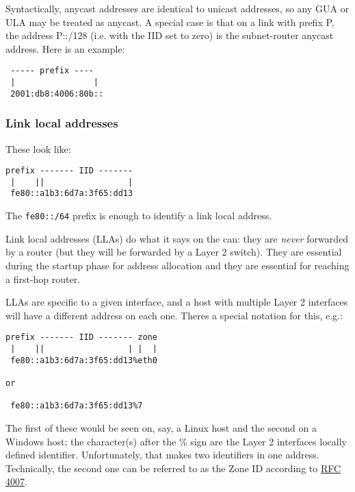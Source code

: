 \documentclass[
]{article}
\begin{document}
Syntactically, anycast addresses are identical to unicast addresses, so
any GUA or ULA may be treated as anycast. A special case is that on a
link with prefix P, the address P::/128 (i.e. with the IID set to zero)
is the subnet-router anycast address. Here is an example:

\begin{verbatim}
 ----- prefix ----
 |                |
 2001:db8:4006:80b::
\end{verbatim}

\subsubsection{Link local addresses}\label{link-local-addresses}

These look like:

\begin{verbatim}
prefix ------- IID -------
 |    ||                 |
 fe80::a1b3:6d7a:3f65:dd13
\end{verbatim}

The \texttt{fe80::/64} prefix is enough to identify a link local
address.

Link local addresses (LLAs) do what it says on the can: they are
\emph{never} forwarded by a router (but they will be forwarded by a
Layer 2 switch). They are essential during the startup phase for address
allocation and they are essential for reaching a first-hop router.

LLAs are specific to a given interface, and a host with multiple Layer 2
interfaces will have a different address on each one.
There\textquotesingle s a special notation for this, e.g.:

\begin{verbatim}
prefix ------- IID ------- zone
 |    ||                 | |  |
 fe80::a1b3:6d7a:3f65:dd13%eth0

or

 fe80::a1b3:6d7a:3f65:dd13%7
\end{verbatim}

The first of these would be seen on, say, a Linux host and the second on
a Windows host; the character(s) after the
\textquotesingle\%\textquotesingle{} sign are the Layer 2
interface\textquotesingle s locally defined identifier. Unfortunately,
that makes two \textquotesingle identifiers\textquotesingle{} in one
address. Technically, the second one can be referred to as the
\textquotesingle Zone ID\textquotesingle{} according to
\href{https://www.rfc-editor.org/info/rfc4007}{RFC 4007}.
\end{document}
